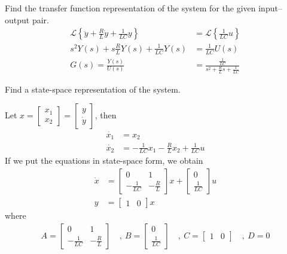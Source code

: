 \documentclass[twoside]{article}
\begin{document}
Find the transfer function representation of the system for the given input--output pair.
%
\begin{align*}
	\mathcal{L} \left\lbrace \ddot{y} + \frac{R}{L} \dot{y} + \frac{1}{LC} y  \right\rbrace 
	&= \mathcal{L} \left\lbrace \frac{1}{LC} u  \right\rbrace
	\\
	s^2 Y(s) + s \frac{R}{L} Y(s) + \frac{1}{LC} Y(s) &=  \frac{1}{LC} U(s) \\
	G(s) = \frac{Y(s)}{U(s)} &= \frac{\frac{1}{LC} }{s^2 + \frac{R}{L} s + \frac{1}{LC} }
\end{align*}

Find a state-space representation of the system.

\par

Let $x = \left[ \begin{array}{c} x_1 \\ x_2 \end{array} \right] = \left[ \begin{array}{c} y \\ \dot{y} \end{array} \right]$, then 
%
\begin{align*}
	\dot{x_1} &= x_2 \\
	\dot{x_2} &= -\frac{1}{LC} x_1 - \frac{R}{L} x_2 + \frac{1}{LC} u
\end{align*}
%
If we put the equations in state-space form, we obtain
%
\begin{align*}
 \dot{x} &= \left[  \begin{array}{cc} 0 & 1 \\ -\frac{1}{LC} &  -\frac{R}{L}  \end{array} \right] x 
 +  \left[  \begin{array}{c} 0 \\ \frac{1}{LC} \end{array} \right] u
 \\
 y &= \left[  \begin{array}{cc} 1 & 0 \end{array} \right] x 
\end{align*}
%
where
%
\begin{align*}
 A = \left[  \begin{array}{cc} 0 & 1 \\ -\frac{1}{LC} &  -\frac{R}{L}  \end{array} \right] \quad , \
 B = \left[  \begin{array}{c} 0 \\ \frac{1}{LC} \end{array} \right]  \quad , \
 C = \left[  \begin{array}{cc} 1 & 0 \end{array} \right] \quad , \
 D = 0
\end{align*}
\end{document}
